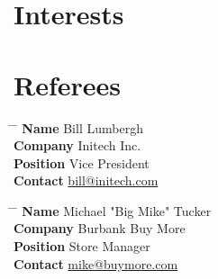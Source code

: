 \documentclass[10pt]{article} %
\begin{document}

\section{Interests}



\section{Referees}

\parbox{0.5\textwidth}{ %
\begin{tabbing}
\hspace{2.75cm} \= \hspace{4cm} \= \kill %
{\bf Name} \> Bill Lumbergh \\ %
{\bf Company} \> Initech Inc. \\ %
{\bf Position} \> Vice President \\ %
{\bf Contact} \> \href{mailto:bill@initech.com}{bill@initech.com} %
\end{tabbing}}
\hfill %
\parbox{0.5\textwidth}{ %
\begin{tabbing}
\hspace{2.75cm} \= \hspace{4cm} \= \kill %
{\bf Name} \> Michael "Big Mike" Tucker\\ %
{\bf Company} \> Burbank Buy More \\ %
{\bf Position} \> Store Manager \\ %
{\bf Contact} \> \href{mailto:mike@buymore.com}{mike@buymore.com} %
\end{tabbing}}

\end{document}
